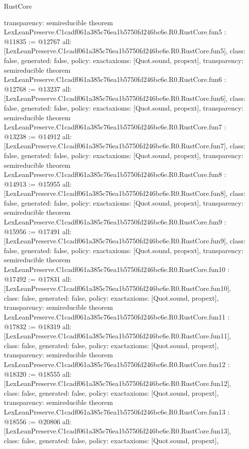 \begin{lexlean}{RustCore}
\begin{coremodule}
{  transparency: semireducible
}
theorem LexLeanPreserve.C1cadf061a385c76ea1b5750fd246bc6e.R0.RustCore.fun5 : @11835 := @12767 {
  all: [LexLeanPreserve.C1cadf061a385c76ea1b5750fd246bc6e.R0.RustCore.fun5],
  class: false,
  generated: false,
  policy: exact{axioms: [Quot.sound, propext]},
  transparency: semireducible
}
theorem LexLeanPreserve.C1cadf061a385c76ea1b5750fd246bc6e.R0.RustCore.fun6 : @12768 := @13237 {
  all: [LexLeanPreserve.C1cadf061a385c76ea1b5750fd246bc6e.R0.RustCore.fun6],
  class: false,
  generated: false,
  policy: exact{axioms: [Quot.sound, propext]},
  transparency: semireducible
}
theorem LexLeanPreserve.C1cadf061a385c76ea1b5750fd246bc6e.R0.RustCore.fun7 : @13238 := @14912 {
  all: [LexLeanPreserve.C1cadf061a385c76ea1b5750fd246bc6e.R0.RustCore.fun7],
  class: false,
  generated: false,
  policy: exact{axioms: [Quot.sound, propext]},
  transparency: semireducible
}
theorem LexLeanPreserve.C1cadf061a385c76ea1b5750fd246bc6e.R0.RustCore.fun8 : @14913 := @15955 {
  all: [LexLeanPreserve.C1cadf061a385c76ea1b5750fd246bc6e.R0.RustCore.fun8],
  class: false,
  generated: false,
  policy: exact{axioms: [Quot.sound, propext]},
  transparency: semireducible
}
theorem LexLeanPreserve.C1cadf061a385c76ea1b5750fd246bc6e.R0.RustCore.fun9 : @15956 := @17491 {
  all: [LexLeanPreserve.C1cadf061a385c76ea1b5750fd246bc6e.R0.RustCore.fun9],
  class: false,
  generated: false,
  policy: exact{axioms: [Quot.sound, propext]},
  transparency: semireducible
}
theorem LexLeanPreserve.C1cadf061a385c76ea1b5750fd246bc6e.R0.RustCore.fun10 : @17492 := @17831 {
  all: [LexLeanPreserve.C1cadf061a385c76ea1b5750fd246bc6e.R0.RustCore.fun10],
  class: false,
  generated: false,
  policy: exact{axioms: [Quot.sound, propext]},
  transparency: semireducible
}
theorem LexLeanPreserve.C1cadf061a385c76ea1b5750fd246bc6e.R0.RustCore.fun11 : @17832 := @18319 {
  all: [LexLeanPreserve.C1cadf061a385c76ea1b5750fd246bc6e.R0.RustCore.fun11],
  class: false,
  generated: false,
  policy: exact{axioms: [Quot.sound, propext]},
  transparency: semireducible
}
theorem LexLeanPreserve.C1cadf061a385c76ea1b5750fd246bc6e.R0.RustCore.fun12 : @18320 := @18555 {
  all: [LexLeanPreserve.C1cadf061a385c76ea1b5750fd246bc6e.R0.RustCore.fun12],
  class: false,
  generated: false,
  policy: exact{axioms: [Quot.sound, propext]},
  transparency: semireducible
}
theorem LexLeanPreserve.C1cadf061a385c76ea1b5750fd246bc6e.R0.RustCore.fun13 : @18556 := @20806 {
  all: [LexLeanPreserve.C1cadf061a385c76ea1b5750fd246bc6e.R0.RustCore.fun13],
  class: false,
  generated: false,
  policy: exact{axioms: [Quot.sound, propext]},
}
\end{coremodule}
\end{lexlean}
